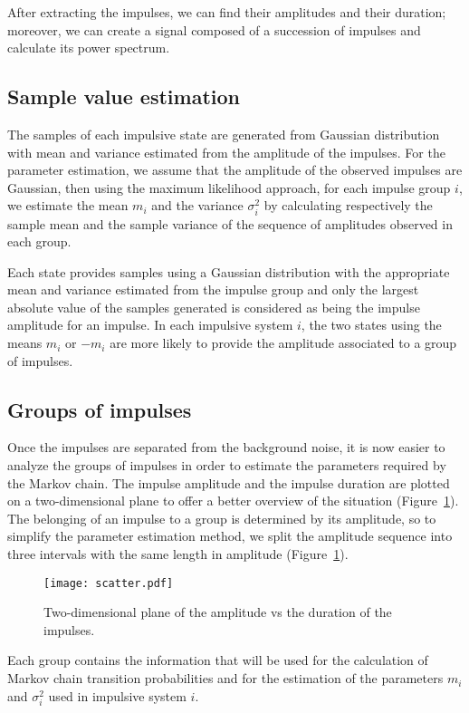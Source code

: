 \documentclass[journal]{IEEEtran}
\begin{document}
After extracting the impulses, we can find their amplitudes and their duration; moreover, we can create a signal composed of a succession of impulses and calculate its power spectrum.
\subsection{Sample value estimation}
The samples of each impulsive state are generated from Gaussian distribution with mean and variance estimated from the amplitude of the impulses. For the parameter estimation, we assume that the amplitude of the observed impulses are Gaussian, then using the maximum likelihood approach, for each impulse group $i$, we estimate the mean $m_i$ and the variance $\sigma^2_i$ by calculating respectively the sample mean and the sample variance of the sequence of amplitudes observed in each group.\

Each state provides samples using a Gaussian distribution with the appropriate mean and variance estimated from the impulse group and only the largest absolute value of the samples generated is considered as being the impulse amplitude for an impulse. In each impulsive system $i$, the two states using the means $m_i$ or $-m_i$ are more likely to provide the amplitude associated to a group of impulses.
\subsection{Groups of impulses}
Once the impulses are separated from the background noise, it is now easier to analyze the groups of impulses in order to estimate the parameters required by the Markov chain. The impulse amplitude and the impulse duration are plotted on a two-dimensional plane to offer a better overview of the situation (Figure~\ref{scatter}). The belonging of an impulse to a group is determined by its amplitude, so to simplify the parameter estimation method, we split the amplitude sequence into three intervals with the same length in amplitude (Figure~\ref{scatter}).
\begin{figure}[h]
\begin{center}
    \texttt{[image: scatter.pdf]}
\end{center}
  \caption{Two-dimensional plane of the amplitude vs the duration of the impulses.}\label{scatter}
\end{figure}
Each group contains the information that will be used for the calculation of Markov chain transition probabilities and for the estimation of the parameters $m_i$ and $\sigma^2_i$ used in impulsive system $i$.
\end{document}
